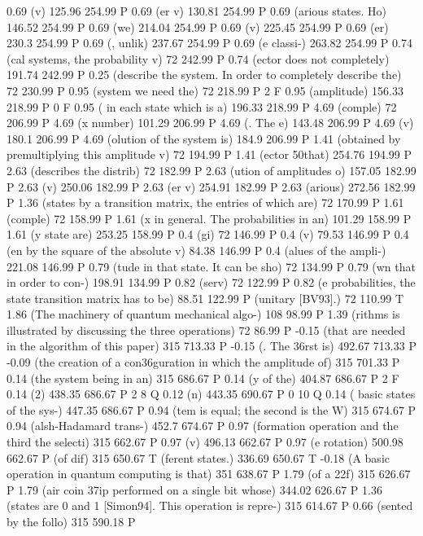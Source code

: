 0.69 (v) 125.96 254.99 P
0.69 (er v) 130.81 254.99 P
0.69 (arious states. Ho) 146.52 254.99 P
0.69 (we) 214.04 254.99 P
0.69 (v) 225.45 254.99 P
0.69 (er) 230.3 254.99 P
0.69 (, unlik) 237.67 254.99 P
0.69 (e classi-) 263.82 254.99 P
0.74 (cal systems, the probability v) 72 242.99 P
0.74 (ector does not completely) 191.74 242.99 P
0.25 (describe the system. In order to completely describe the) 72 230.99 P
0.95 (system we need the) 72 218.99 P
2 F
0.95 (amplitude) 156.33 218.99 P
0 F
0.95 ( in each state which is a) 196.33 218.99 P
4.69 (comple) 72 206.99 P
4.69 (x number) 101.29 206.99 P
4.69 (. The e) 143.48 206.99 P
4.69 (v) 180.1 206.99 P
4.69 (olution of the system is) 184.9 206.99 P
1.41 (obtained by premultiplying this amplitude v) 72 194.99 P
1.41 (ector \050that) 254.76 194.99 P
2.63 (describes the distrib) 72 182.99 P
2.63 (ution of amplitudes o) 157.05 182.99 P
2.63 (v) 250.06 182.99 P
2.63 (er v) 254.91 182.99 P
2.63 (arious) 272.56 182.99 P
1.36 (states by a transition matrix, the entries of which are) 72 170.99 P
1.61 (comple) 72 158.99 P
1.61 (x in general. The probabilities in an) 101.29 158.99 P
1.61 (y state are) 253.25 158.99 P
0.4 (gi) 72 146.99 P
0.4 (v) 79.53 146.99 P
0.4 (en by the square of the absolute v) 84.38 146.99 P
0.4 (alues of the ampli-) 221.08 146.99 P
0.79 (tude in that state. It can be sho) 72 134.99 P
0.79 (wn that in order to con-) 198.91 134.99 P
0.82 (serv) 72 122.99 P
0.82 (e probabilities, the state transition matrix has to be) 88.51 122.99 P
(unitary [BV93].) 72 110.99 T
1.86 (The machinery of quantum mechanical algo-) 108 98.99 P
1.39 (rithms is illustrated by discussing the three operations) 72 86.99 P
-0.15 (that are needed in the algorithm of this paper) 315 713.33 P
-0.15 (. The \336rst is) 492.67 713.33 P
-0.09 (the creation of a con\336guration in which the amplitude of) 315 701.33 P
0.14 (the system being in an) 315 686.67 P
0.14 (y of the) 404.87 686.67 P
2 F
0.14 (2) 438.35 686.67 P
2 8 Q
0.12 (n) 443.35 690.67 P
0 10 Q
0.14 ( basic states of the sys-) 447.35 686.67 P
0.94 (tem is equal; the second is the W) 315 674.67 P
0.94 (alsh-Hadamard trans-) 452.7 674.67 P
0.97 (formation operation and the third the selecti) 315 662.67 P
0.97 (v) 496.13 662.67 P
0.97 (e rotation) 500.98 662.67 P
(of dif) 315 650.67 T
(ferent states.) 336.69 650.67 T
-0.18 (A basic operation in quantum computing is that) 351 638.67 P
1.79 (of a \322f) 315 626.67 P
1.79 (air coin \337ip performed on a single bit whose) 344.02 626.67 P
1.36 (states are 0 and 1 [Simon94]. This operation is repre-) 315 614.67 P
0.66 (sented by the follo) 315 590.18 P
